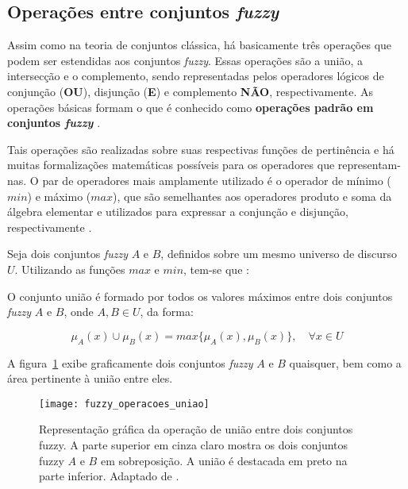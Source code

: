 \subsection{Operações entre conjuntos \emph{fuzzy}}

Assim como na teoria de conjuntos clássica, há basicamente três operações que podem ser estendidas aos conjuntos \emph{fuzzy}. Essas operações são a união, a intersecção e o complemento, sendo representadas pelos operadores lógicos de conjunção (\textbf{OU}), disjunção (\textbf{E}) e complemento \textbf{NÃO}, respectivamente. As operações básicas formam o que é conhecido como \textbf{operações padrão em conjuntos \emph{fuzzy}} \citep{klir:95}.

Tais operações são realizadas sobre suas respectivas funções de pertinência e há muitas formalizações matemáticas possíveis para os operadores que representam-nas. O par de operadores mais amplamente utilizado é o operador de mínimo ($min$) e máximo ($max$), que são semelhantes aos operadores produto e soma da álgebra elementar e utilizados para expressar a conjunção e disjunção, respectivamente \citep{thole:79}.

Seja dois conjuntos \emph{fuzzy} $A$ e $B$, definidos sobre um mesmo universo de discurso $U$. Utilizando as funções $max$ e $min$, tem-se que \citep{klir:95}:

\begin{defn}
\label{def:conjunto_fuzzy_uniao}
O conjunto união é formado por todos os valores máximos entre dois conjuntos \emph{fuzzy} $A$ e $B$, onde $A, B \in U$, da forma:

\begin{equation}
  \mu_A(x) \cup \mu_B(x) = max\{\mu_A(x), \mu_B(x)\}, \quad \forall x \in U
\end{equation}
\end{defn}

A figura~\ref{fig:fuzzy_operacoes_uniao} exibe graficamente dois conjuntos \emph{fuzzy} $A$ e $B$ quaisquer, bem como a área pertinente à união entre eles.

\begin{figure}[!h]
  \centering
  \texttt{[image: fuzzy\_operacoes\_uniao]}
  \caption[Operação de união entre dois conjuntos fuzzy]{Representação gráfica da operação de união entre dois conjuntos fuzzy. A parte superior em cinza claro mostra os dois conjuntos fuzzy $A$ e $B$ em sobreposição. A união é destacada em preto na parte inferior. Adaptado de \citet{vrusias:06}.}
  \label{fig:fuzzy_operacoes_uniao}
\end{figure}

